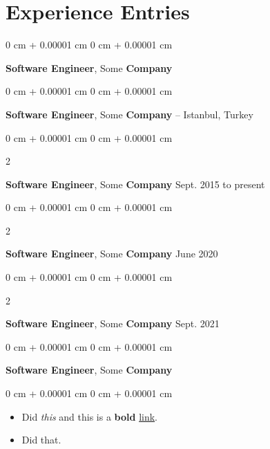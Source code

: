 \documentclass[10pt, letterpaper]{article}
\newenvironment{highlights}{
    \begin{itemize}[
        topsep=0.10 cm,
        parsep=0.10 cm,
        partopsep=0pt,
        itemsep=0pt,
        leftmargin=0 cm + 10pt
    ]
}{
    \end{itemize}
} %
\newenvironment{onecolentry}{
    \begin{adjustwidth}{
        0 cm + 0.00001 cm
    }{
        0 cm + 0.00001 cm
    }
}{
    \end{adjustwidth}
} %
\newenvironment{twocolentry}[2][]{
    \onecolentry
    \def\secondColumn{#2}
    \setcolumnwidth{\fill, 4.5 cm}
    \begin{paracol}{2}
}{
    \switchcolumn \raggedleft \secondColumn
    \end{paracol}
    \endonecolentry
} %
\begin{document}
    
    \section{Experience Entries}

        
        \begin{onecolentry}
            \textbf{Software Engineer}, Some \textbf{Company}\end{onecolentry}



        \vspace{0.2 cm}

        \begin{onecolentry}
            \textbf{Software Engineer}, Some \textbf{Company} -- Istanbul, Turkey\end{onecolentry}



        \vspace{0.2 cm}

        \begin{twocolentry}{
            Sept. 2015 to present
        }
            \textbf{Software Engineer}, Some \textbf{Company}\end{twocolentry}



        \vspace{0.2 cm}

        \begin{twocolentry}{
            June 2020
        }
            \textbf{Software Engineer}, Some \textbf{Company}\end{twocolentry}



        \vspace{0.2 cm}

        \begin{twocolentry}{
            Sept. 2021
        }
            \textbf{Software Engineer}, Some \textbf{Company}\end{twocolentry}



        \vspace{0.2 cm}

        \begin{onecolentry}
            \textbf{Software Engineer}, Some \textbf{Company}\end{onecolentry}

        \vspace{0.10 cm}
        \begin{onecolentry}
            \begin{highlights}
                \item Did \textit{this} and this is a \textbf{bold} \href{https://example.com}{link}.
                \item Did that.
            \end{highlights}
        \end{onecolentry}
\end{document}
